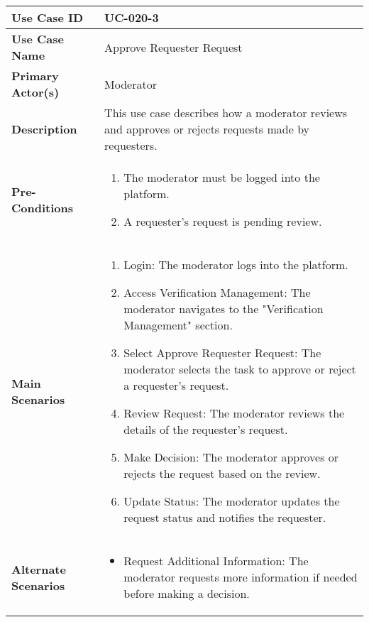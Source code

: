 \begin{table}[!ht]
    \centering
    \renewcommand{\arraystretch}{1.3} %
    \begin{tabularx}{\textwidth}{|l|X|}
        \hline
        \textbf{Use Case ID} & UC-020-3 \\
        \hline
        \textbf{Use Case Name} & Approve Requester Request \\
        \hline
        \textbf{Primary Actor(s)} & Moderator \\
        \hline
        \textbf{Description} & This use case describes how a moderator reviews and approves or rejects requests made by requesters. \\
        \hline
        \textbf{Pre-Conditions} & 
        \begin{enumerate}[label=\arabic*.,itemsep=0pt]
            \item The moderator must be logged into the platform.
            \item A requester’s request is pending review.
        \end{enumerate} \\
        \hline
        \textbf{Main Scenarios} & 
        \begin{enumerate}[label=\arabic*.,itemsep=0pt]
            \item Login: The moderator logs into the platform.
            \item Access Verification Management: The moderator navigates to the "Verification Management" section.
            \item Select Approve Requester Request: The moderator selects the task to approve or reject a requester’s request.
            \item Review Request: The moderator reviews the details of the requester’s request.
            \item Make Decision: The moderator approves or rejects the request based on the review.
            \item Update Status: The moderator updates the request status and notifies the requester.
        \end{enumerate} \\
        \hline
        \textbf{Alternate Scenarios} & 
        \begin{itemize}[label=--,itemsep=0pt]
            \item Request Additional Information: The moderator requests more information if needed before making a decision.

\end{itemize}
\end{tabularx}
\end{table}
